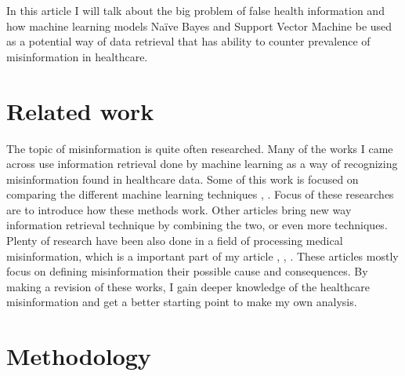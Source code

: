 \documentclass[11pt ,english,a4paper]{article}
\begin{document}
In this article I will talk about the big problem of false health information and how machine learning models Naïve Bayes and Support Vector Machine be used as a potential way of data retrieval that has ability to counter prevalence of misinformation in healthcare.

\section{Related work}

The topic of misinformation is quite often researched. Many of the works I came across use information retrieval done by machine learning as a way of recognizing misinformation found in healthcare data. Some of this work is focused on comparing the different machine learning techniques \cite{sha20mach}, \cite{pod19mach}. Focus of these researches are to introduce how these methods work. Other articles bring new way information retrieval technique \cite{chap22unmask} by combining the two, or even more techniques. Plenty of research have been also done in a field of processing medical misinformation, which is a important part of my article \cite{gu20misinfo}, \cite{cook15misinfo}, \cite{wa19sys}. These articles mostly focus on defining misinformation their possible cause and consequences. By making a revision of these works, I gain deeper knowledge of the healthcare misinformation and get a better starting point to make my own analysis.

\section{Methodology}\label{methodology}
\end{document}
